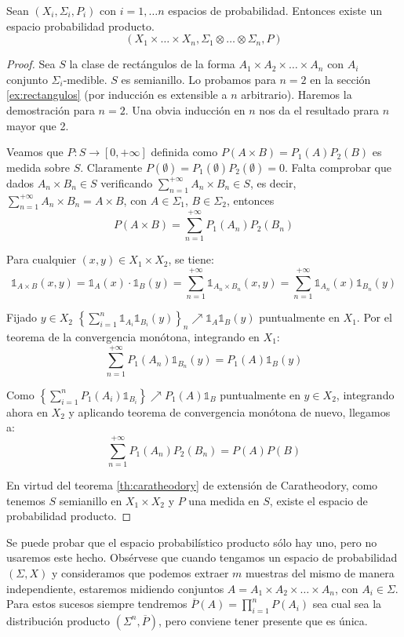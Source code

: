\begin{theorem}
 Sean $(X_i, \Sigma_i, P_i)$ con $i=1,\ldots n$ espacios de probabilidad. Entonces existe un espacio probabilidad
 producto.
 \[(X_1 \times \ldots \times X_n, \Sigma_1 \otimes \ldots \otimes \Sigma_n, P)\]
\end{theorem}
  \begin{proof}
   Sea $S$ la clase de rectángulos de la forma $A_1 \times A_2 \times \ldots \times A_n$ con $A_i$ conjunto 
   $\Sigma_i$-medible. $S$ es semianillo. Lo probamos para $n=2$ en la sección \ref{ex:rectangulos} (por inducción es 
   extensible a $n$ arbitrario). Haremos la demostración para $n=2$. Una obvia inducción en $n$ nos da el 
   resultado prara $n$ mayor que 2.
   
   Veamos que $P:S \rightarrow [0,+\infty]$ definida como $P(A\times B) = P_1(A) P_2(B)$ es medida sobre $S$.
   Claramente $P(\emptyset) = P_1(\emptyset)P_2(\emptyset) = 0$. Falta comprobar que dados $A_n \times B_n \in S$ 
   verificando $\sum_{n=1}^{+\infty} A_n\times B_n \in S$,
   es decir, $\sum_{n=1}^{+\infty} A_n\times B_n = A\times B$, con $A \in \Sigma_1$, $B \in \Sigma_2$, entonces
   \[P(A\times B) = \sum_{n=1}^{+\infty} P_1(A_n) P_2(B_n)\]
   
   Para cualquier $(x,y) \in X_1 \times X_2$, se tiene:
   \[
     \mathds{1}_{A\times B}(x,y) = \mathds{1}_{A}(x)\cdot \mathds{1}_B(y) = \sum_{n=1}^{+\infty} 
     \mathds{1}_{A_n\times B_n}(x,y) = \sum_{n=1}^{+\infty} \mathds{1}_{A_n}(x) \mathds{1}_{B_n}(y)
   \] 
   
   Fijado $y\in X_2$ $\left\{\sum_{i=1}^{n} \mathds{1}_{A_i}\mathds{1}_{B_i}(y)\right\}_n \nearrow \mathds{1}_A \mathds{1}_B(y)$ 
   puntualmente en $X_1$. Por el teorema de la convergencia monótona, integrando en $X_1$:
   \[\sum_{n=1}^{+\infty} P_1(A_n)\mathds{1}_{B_n}(y) = P_1(A) \mathds{1}_B(y)\]
   
   Como $\left\{\sum_{i=1}^{n} P_1(A_i)\mathds{1}_{B_i}\right\} \nearrow P_1(A) \mathds{1}_B$ puntualmente en $y\in X_2$, 
   integrando ahora en $X_2$ y aplicando teorema de convergencia monótona de nuevo, llegamos a:
   \[
     \sum_{n=1}^{+\infty} P_1(A_n) P_2(B_n) = P(A) P(B)
   \]
   
   En virtud del teorema \ref{th:caratheodory} de extensión de Caratheodory, como tenemos $S$ semianillo en 
   $X_1\times X_2$ y $P$ una medida en $S$, existe el espacio de probabilidad producto.
  \end{proof}

Se puede probar que el espacio probabilístico producto sólo hay uno, pero no usaremos este hecho. Obsérvese que cuando 
tengamos un espacio de probabilidad $(\Sigma, X)$ y consideramos que podemos extraer $m$ muestras del mismo
de manera independiente, estaremos midiendo conjuntos $A=A_1 \times A_2 \times \ldots \times A_n$, con $A_i \in\Sigma$.
Para estos sucesos siempre tendremos $\overline{P}(A) = \prod_{i=1}^n P(A_i)$ sea cual sea la distribución producto
$(\Sigma^n, \overline{P})$, pero conviene tener presente que es única.

